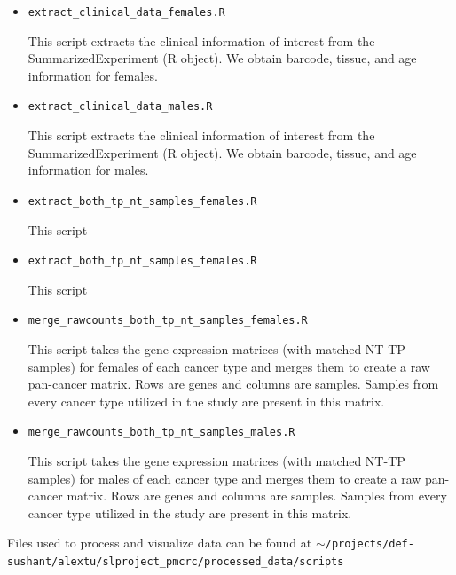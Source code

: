 \documentclass[10pt]{article}
\begin{document}
\begin{itemize}
\item\texttt{extract\_clinical\_data\_females.R}

This script extracts the clinical information of interest from the SummarizedExperiment (R object). We obtain barcode, tissue, and age information for females.

\item\texttt{extract\_clinical\_data\_males.R}

This script extracts the clinical information of interest from the SummarizedExperiment (R object). We obtain barcode, tissue, and age information for males. \newline

\item\texttt{extract\_both\_tp\_nt\_samples\_females.R}

This script 

\item\texttt{extract\_both\_tp\_nt\_samples\_females.R}

This script 

\item\texttt{merge\_rawcounts\_both\_tp\_nt\_samples\_females.R}

This script takes the gene expression matrices (with matched NT-TP samples) for females of each cancer type and merges them to create a raw pan-cancer matrix. Rows are genes and columns are samples. Samples from every cancer type utilized in the study are present in this matrix.

\item\texttt{merge\_rawcounts\_both\_tp\_nt\_samples\_males.R}

This script takes the gene expression matrices (with matched NT-TP samples) for males of each cancer type and merges them to create a raw pan-cancer matrix. Rows are genes and columns are samples. Samples from every cancer type utilized in the study are present in this matrix.



\end{itemize}

Files used to process and visualize data can be found at \texttt{$\sim$/projects/def-sushant/alextu/\newline slproject\_pmcrc/processed\_data/scripts}
\end{document}
